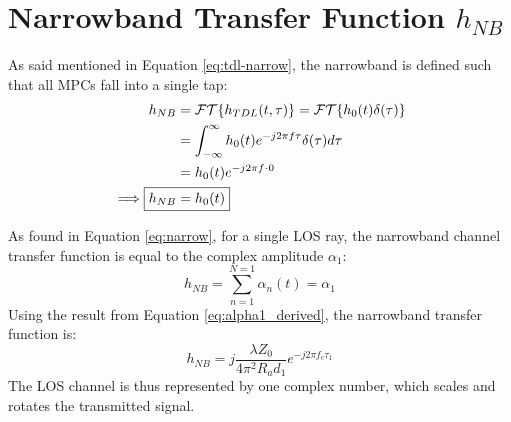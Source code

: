 \section{Narrowband Transfer Function $h_{NB}$}
As said mentioned in Equation \ref{eq:tdl-narrow}, the narrowband is defined such that all MPCs fall into a single tap:
\begin{align}
	h_{NB} &= \mathcal{FT}\{ h_{TDL}(t, \tau)\} = \mathcal{FT}\{ h_{0}(t)\delta(\tau)\} \\
	&= \int_{-\infty}^{\infty} h_0(t) e^{-j2\pi f \tau} \delta(\tau) d\tau \\
	&=h_0(t)e^{-j2\pi f \cdot \hspace{0.05em} 0} \\
	\implies \Aboxed{h_{NB} &= h_0(t)}
\end{align}

As found in Equation \ref{eq:narrow}, for a single LOS ray, the narrowband channel transfer function is equal to the complex amplitude $\alpha_1$:
\begin{equation}
	h_{NB} = \sum_{n=1}^{N=1} \alpha_n(t) = \alpha_1
\end{equation}
Using the result from Equation \ref{eq:alpha1_derived}, the narrowband transfer function is:
\begin{equation}
	\boxed{h_{NB} = j \frac{\lambda Z_0}{4\pi^2 R_a d_1} e^{-j2\pi f_c \tau_1}}
	\label{eq:los_narrowband_tf_detailed}
\end{equation}
The LOS channel is thus represented by one complex number, which scales and rotates the transmitted signal.

